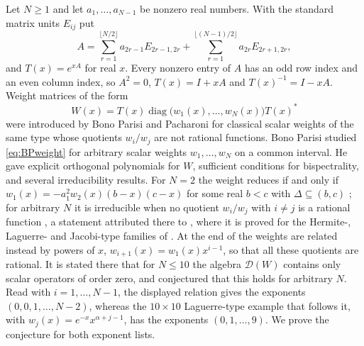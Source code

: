\documentclass[11pt]{amsart}
\theoremstyle{definition}
\theoremstyle{remark}
\numberwithin{equation}{section}
\newcommand{\diag}{\operatorname{diag}}
\newcommand{\cD}{\mathcal{D}}
\begin{document}
Let $N\ge1$ and let $a_1,\dots,a_{N-1}$ be nonzero real numbers. With the
standard matrix units $E_{ij}$ put
\begin{equation}\label{eq:A}
A=\sum_{r=1}^{\lfloor N/2\rfloor}a_{2r-1}E_{2r-1,2r}
 +\sum_{r=1}^{\lfloor (N-1)/2\rfloor}a_{2r}E_{2r+1,2r},
\end{equation}
and $T(x)=e^{xA}$ for real $x$. Every nonzero entry of $A$ has an odd row index and an even column index, so
$A^2=0$, $T(x)=I+xA$ and $T(x)^{-1}=I-xA$. Weight matrices of the form
\begin{equation}\label{eq:BPweight}
W(x)=T(x)\diag\bigl(w_1(x),\dots,w_N(x)\bigr)T(x)^*
\end{equation}
were introduced by Bono Parisi and Pacharoni \cite[Definition~1.1]{BPP} for
classical scalar weights of the same type whose quotients $w_i/w_j$ are not
rational functions. Bono Parisi \cite{BP26} studied \eqref{eq:BPweight} for
arbitrary scalar weights $w_1,\dots,w_N$ on a common interval. He gave
explicit orthogonal polynomials for $W$, sufficient conditions for
bispectrality, and several irreducibility results. For $N=2$ the weight
reduces if and only if $w_1(x)=-a_1^2w_2(x)(b-x)(c-x)$ for some real $b<c$
with $\Delta\subseteq(b,c)$ \cite[Proposition~5.1]{BP26}; for arbitrary $N$ it is
irreducible when no quotient $w_i/w_j$ with $i\ne j$ is a rational function
\cite[Proposition~5.6]{BP26}, a statement attributed there to
\cite[Proposition~3.7]{BPP}, where it is proved for the Hermite-, Laguerre-
and Jacobi-type families of \cite[Definition~1.1]{BPP}. At the end of
\cite[Section~5]{BP26} the weights are related instead by powers of $x$,
$w_{i+1}(x)=w_1(x)x^{i-1}$, so that all these quotients are rational. It is
stated there that for $N\le10$ the algebra $\cD(W)$ contains only scalar
operators of order zero, and conjectured that this holds for arbitrary $N$.
Read with $i=1,\dots,N-1$, the displayed relation gives the exponents
$(0,0,1,\dots,N-2)$, whereas the $10\times10$ Laguerre-type example that
follows it, with $w_j(x)=e^{-x}x^{\alpha+j-1}$, has the exponents
$(0,1,\dots,9)$. We prove the conjecture for both exponent lists.
\end{document}
